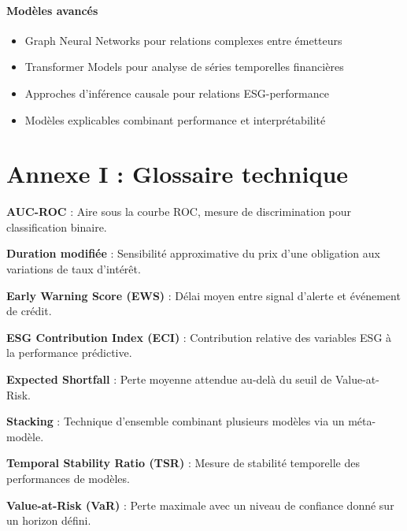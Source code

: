 \paragraph{Modèles avancés}
\begin{itemize}
\item Graph Neural Networks pour relations complexes entre émetteurs
\item Transformer Models pour analyse de séries temporelles financières
\item Approches d'inférence causale pour relations ESG-performance
\item Modèles explicables combinant performance et interprétabilité
\end{itemize}

\section{Annexe I : Glossaire technique}

\textbf{AUC-ROC} : Aire sous la courbe ROC, mesure de discrimination pour classification binaire.

\textbf{Duration modifiée} : Sensibilité approximative du prix d'une obligation aux variations de taux d'intérêt.

\textbf{Early Warning Score (EWS)} : Délai moyen entre signal d'alerte et événement de crédit.

\textbf{ESG Contribution Index (ECI)} : Contribution relative des variables ESG à la performance prédictive.

\textbf{Expected Shortfall} : Perte moyenne attendue au-delà du seuil de Value-at-Risk.

\textbf{Stacking} : Technique d'ensemble combinant plusieurs modèles via un méta-modèle.

\textbf{Temporal Stability Ratio (TSR)} : Mesure de stabilité temporelle des performances de modèles.

\textbf{Value-at-Risk (VaR)} : Perte maximale avec un niveau de confiance donné sur un horizon défini.